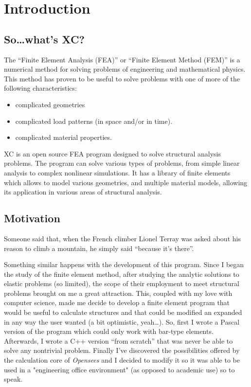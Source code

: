 \chapter{Introduction}

\section{So\ldots what's XC?}
The ``Finite Element Analysis (FEA)'' or ``Finite Element Method (FEM)'' is a numerical method for solving problems of engineering and mathematical physics. This method has proven to be useful to solve problems with one of more of the following characteristics:

\begin{itemize}
\item complicated geometries
\item complicated load patterns (in space and/or in time).
\item complicated material properties.
\end{itemize}

XC is an open source FEA program designed to solve structural analysis problems. The program can solve various types of problems, from simple linear analysis to complex nonlinear simulations. It has a library of finite elements which allows to model various geometries, and multiple material models, allowing its application in various areas of structural analysis.

\section{Motivation}
Someone said that, when the French climber Lionel Terray was asked about his reason to climb a mountain, he simply said ``because it's there''.

Something similar happens with the development of this program. Since I began the study of the finite element method, after studying the analytic solutions to elastic problems (so limited), the scope of their employment to meet structural problems brought on me a great attraction. This, coupled with my love with computer science, made me decide to develop a finite element program that would be useful to calculate structures and that could be modified an expanded in any way the user wanted (a bit optimistic, yeah\ldots). So, first I wrote a Pascal version of the program which could only work with bar-type elements. Afterwards, I wrote a C++ version ``from scratch'' that was never be able to solve any nontrivial problem. Finally I've discovered the possibilities offered by the calculation core of \emph{Opensees} and I decided to modify it so it was able to be used in a "engineering office environment" (as opposed to academic use) so to speak.

